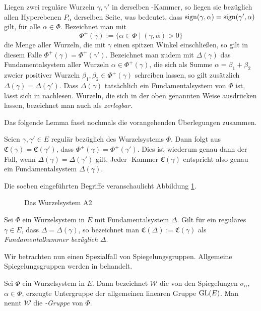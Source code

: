 Liegen zwei reguläre Wurzeln $\gamma, \gamma'$ in derselben \weyl-Kammer, so liegen sie bezüglich allen Hyperebenen $P_\alpha$ derselben Seite, was bedeutet, dass $\operatorname{sign} (\gamma, \alpha) = \operatorname{sign}( \gamma', \alpha)$ gilt, für alle $\alpha \in \Phi$.
Bezeichnet man mit
\begin{displaymath}
  \Phi^+(\gamma) := \{ \alpha \in \Phi \mid (\gamma, \alpha) > 0 \}
\end{displaymath}
die Menge aller Wurzeln, die mit $\gamma$ einen spitzen Winkel einschließen, so gilt in diesem Falle $\Phi^+(\gamma) = \Phi^+(\gamma')$.
Bezeichnet man zudem mit $\Delta(\gamma)$ das Fundamentalsystem aller Wurzeln $\alpha \in \Phi^+(\gamma)$, die sich als Summe $\alpha = \beta_1 + \beta_2$ zweier positiver Wurzeln $\beta_1, \beta_2 \in \Phi^+(\gamma)$ schreiben lassen, so gilt zusätzlich $\Delta(\gamma) = \Delta(\gamma')$. 
Dass $\Delta(\gamma)$ tatsächlich ein Fundamentalsystem von $\Phi$ ist, lässt sich in \cite[S.48]{humphreys1972introduction} nachlesen.
Wurzeln, die sich in der oben genannten Weise ausdrücken lassen, bezeichnet man auch als \emph{zerlegbar}.

Das folgende Lemma fasst nochmals die vorangehenden Überlegungen zusammen.

\begin{lem}
  Seien $\gamma, \gamma' \in E$ regulär bezüglich des Wurzelsystems $\Phi$.
  Dann folgt aus $\mathfrak{C}(\gamma) = \mathfrak{C}(\gamma')$, dass $\Phi^+(\gamma) = \Phi^+(\gamma')$. 
  Dies ist wiederum genau dann der Fall, wenn $\Delta(\gamma) = \Delta(\gamma')$ gilt.
  Jeder \weyl-Kammer $\mathfrak{C}(\gamma)$ entspricht also genau ein Fundamentalsystem $\Delta(\gamma)$.
\end{lem}

Die soeben eingeführten Begriffe veranschaulicht Abbildung \ref{fig:fundamentalWeylChamber}.

\begin{figure}
  \caption{Das Wurzelsystem A2}
  \label{fig:fundamentalWeylChamber}
\end{figure}

\begin{defn}
  Sei $\Phi$ ein Wurzelsystem in $E$ mit Fundamentalsystem $\Delta$.
  Gilt für ein reguläres $\gamma \in E$, dass $\Delta = \Delta(\gamma)$, so bezeichnet man $\mathfrak{C}(\Delta) := \mathfrak{C}(\gamma)$ als \emph{Fundamentalkammer bezüglich} $\Delta$.
\end{defn}

Wir betrachten nun einen Spezialfall von Spiegelungsgruppen. Allgemeine Spiegelungsgruppen werden in \cite{humphreys1992reflection} behandelt.

\begin{defn}
  Sei $\Phi$ ein Wurzelsystem in $E$. Dann bezeichnet $\mathcal{W}$ die von den Spiegelungen $\sigma_\alpha$, $\alpha \in \Phi$, erzeugte Untergruppe der allgemeinen linearen Gruppe $\operatorname{GL}(E)$. Man nennt $\mathcal{W}$ die \emph{\weyl-Gruppe} von $\Phi$.
\end{defn}

